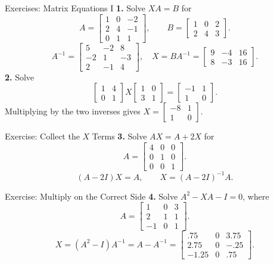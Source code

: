\begin{frame}[shrink=8]{Exercises: Matrix Equations I}
\textbf{1.} Solve $XA=B$ for
\[
A=\begin{bmatrix}1&0&-2\\2&4&-1\\0&1&1\end{bmatrix},\qquad
B=\begin{bmatrix}1&0&2\\2&4&3\end{bmatrix}.
\]
\pause
\[
A^{-1}=\begin{bmatrix}5&-2&8\\-2&1&-3\\2&-1&4\end{bmatrix},
\quad X=BA^{-1}=\begin{bmatrix}9&-4&16\\8&-3&16\end{bmatrix}.
\]
\pause
\textbf{2.} Solve
\[
\begin{bmatrix}1&4\\0&1\end{bmatrix}X
\begin{bmatrix}1&0\\3&1\end{bmatrix}
=\begin{bmatrix}-1&1\\1&0\end{bmatrix}.
\]
Multiplying by the two inverses gives $X=\begin{bmatrix}-8&1\\1&0\end{bmatrix}$.
\end{frame}

\begin{frame}{Exercise: Collect the $X$ Terms}
\textbf{3.} Solve $AX=A+2X$ for
\[
A=\begin{bmatrix}4&0&0\\0&1&0\\0&0&1\end{bmatrix}.
\]
\pause
\[(A-2I)X=A,\qquad X=(A-2I)^{-1}A.\]
\end{frame}

\begin{frame}{Exercise: Multiply on the Correct Side}
\textbf{4.} Solve $A^2-XA-I=0$, where
\[
A=\begin{bmatrix}1&0&3\\2&1&1\\-1&0&1\end{bmatrix}.
\]
\pause
\[
X=(A^2-I)A^{-1}=A-A^{-1}
=\begin{bmatrix}.75&0&3.75\\2.75&0&-.25\\-1.25&0&.75\end{bmatrix}.
\]
\end{frame}

